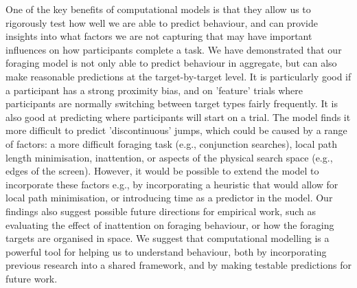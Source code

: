 \documentclass[vision,article,accept,pdftex,moreauthors]{Definitions/mdpi}
\begin{document}
One of the key benefits of computational models is that they allow us to rigorously test how well we are able to predict behaviour, and can provide insights into what factors we are not capturing that may have important influences on how participants complete a task. We have demonstrated that our foraging model \cite{clarke2022foraging} is not only able to predict behaviour in aggregate, but can also make reasonable predictions at the target-by-target level. It is particularly good if a participant has a strong proximity bias, and on 'feature' trials where participants are normally switching between target types fairly frequently. It is also good at predicting where participants will start on a trial. The model finds it more difficult to predict 'discontinuous' jumps, which could be caused by a range of factors: a more difficult foraging task (e.g., conjunction searches), local path length minimisation, inattention, or aspects of the physical search space (e.g., edges of the screen). However, it would be possible to extend the model to incorporate these factors e.g., by incorporating a heuristic that would allow for local path minimisation, or introducing time as a predictor in the model. Our findings also suggest possible future directions for empirical work, such as evaluating the effect of inattention on foraging behaviour, or how the foraging targets are organised in space. We suggest that computational modelling is a powerful tool for helping us to understand behaviour, both by incorporating previous research into a shared framework, and by making testable predictions for future work.


\vspace{6pt} 



\end{document}
